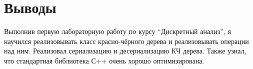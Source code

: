 \section{Выводы}

Выполнив первую лабораторную работу по курсу \enquote{Дискретный анализ}, я научился реализовывать класс красно-чёрного дерева и реализовывать операции над ним. Реализовал сериализацию и десериализацию КЧ дерева. Также узнал, что стандартная библиотека С++ очень хорошо оптимизирована.
\pagebreak
